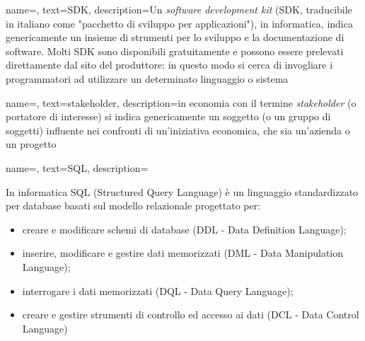 {
    name=,
    text=SDK,
    description={Un \emph{software development kit} (SDK, traducibile in italiano come "pacchetto di sviluppo per applicazioni"), in informatica, indica genericamente un insieme di strumenti per lo sviluppo e la documentazione di software. Molti SDK sono disponibili gratuitamente e possono essere prelevati direttamente dal sito del produttore: in questo modo si cerca di invogliare i programmatori ad utilizzare un determinato linguaggio o sistema}
}

{
    name=,
    text=stakeholder,
    description={in economia con il termine \emph{stakeholder} (o portatore di interesse)
si indica genericamente un soggetto (o un gruppo di soggetti) influente nei
confronti di un’iniziativa economica, che sia un’azienda o un progetto}
}

{
    name=,
    text=SQL,
    description={In informatica SQL (Structured Query Language) è un linguaggio standardizzato per database basati sul modello relazionale progettato per:
\begin{itemize}
	\item creare e modificare schemi di database (DDL - Data Definition Language);
	\item inserire, modificare e gestire dati memorizzati (DML - Data Manipulation
Language);
	\item interrogare i dati memorizzati (DQL - Data Query Language);
	\item creare e gestire strumenti di controllo ed accesso ai dati (DCL - Data Control
Language)
\end{itemize}}
}

